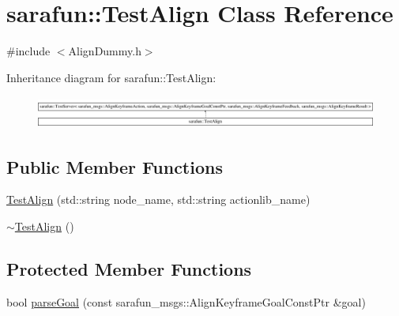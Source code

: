 \hypertarget{classsarafun_1_1TestAlign}{\section{sarafun\-:\-:Test\-Align Class Reference}
\label{classsarafun_1_1TestAlign}
}


{\ttfamily \#include $<$Align\-Dummy.\-h$>$}

Inheritance diagram for sarafun\-:\-:Test\-Align\-:\begin{figure}[H]
\begin{center}
\leavevmode
\includegraphics[height=1.066667cm]{classsarafun_1_1TestAlign}
\end{center}
\end{figure}
\subsection*{Public Member Functions}
\begin{DoxyCompactItemize}
\item 
\hyperlink{classsarafun_1_1TestAlign_aa2815fa88b5bd3f41ba32168d2101d58}{Test\-Align} (std\-::string node\-\_\-name, std\-::string actionlib\-\_\-name)
\item 
\hyperlink{classsarafun_1_1TestAlign_a5d171c40cea90663e8cc6e358132ad3f}{$\sim$\-Test\-Align} ()
\end{DoxyCompactItemize}
\subsection*{Protected Member Functions}
\begin{DoxyCompactItemize}
\item 
bool \hyperlink{classsarafun_1_1TestAlign_ac9c8c7df9316690c7f1daf95f9ef7e04}{parse\-Goal} (const sarafun\-\_\-msgs\-::\-Align\-Keyframe\-Goal\-Const\-Ptr \&goal)
\end{DoxyCompactItemize}


